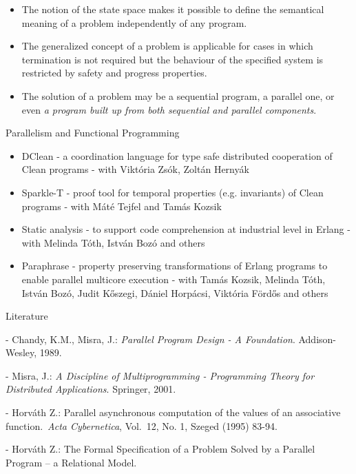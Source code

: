 \documentclass[compress]{beamer}
\begin{document}
\begin{frame}{}

\begin{itemize}


\item The notion of the state space makes
it possible to define the semantical meaning of a
problem independently of any program.\

\item The generalized
concept of a problem is applicable for cases in which termination is
not required but the behaviour of the specified system is
restricted by safety and progress properties.\

\item The solution of a
problem may be a sequential program, a parallel one, or even {\em a
program built up from both sequential and parallel components}.\

\end{itemize}


\end{frame}




 
 
\begin{frame}{Parallelism and Functional Programming}

\begin{itemize}
 
\item DClean - a coordination language for type safe distributed cooperation of Clean programs - with Viktória Zsók, Zoltán Hernyák

\item Sparkle-T - proof tool for temporal properties (e.g. invariants) of Clean programs - with Máté Tejfel and Tamás Kozsik

\item Static analysis - to support code comprehension at industrial level in Erlang - with Melinda Tóth, István Bozó and others

\item Paraphrase  - property preserving transformations of Erlang programs to enable parallel multicore execution - with Tamás Kozsik, Melinda Tóth, István Bozó, Judit Kőszegi, Dániel Horpácsi, Viktória Fördős and others
  
\end{itemize}
\end{frame} 


\begin{frame}{Literature}


- Chandy, K.M., Misra, J.: {\em Parallel Program Design - A Foundation}.
Addison-Wesley, 1989.

- Misra, J.: {\em A Discipline of Multiprogramming - Programming Theory 
for Distributed Applications}. Springer, 2001.

- Horv\'ath Z.:  Parallel asynchronous computation 
of the values of
 an associative function.\ {\em Acta Cybernetica}, Vol.\ 12, No. 1,
 Szeged (1995) 83-94.

- Horv\'ath Z.: The Formal Specification of a 
Problem Solved by a Parallel Program -- a Relational Model.\

\end{frame}
\end{document}
